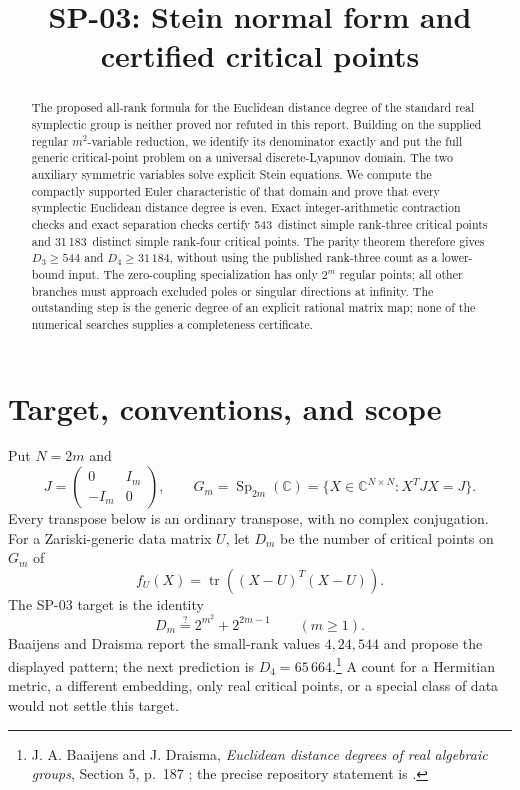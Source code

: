\documentclass[11pt]{article}
\title{SP-03: Stein normal form and certified critical points}
\author{}\date{}
\theoremstyle{remark}\newtheorem{remark}[theorem]{Remark}
\DeclareMathOperator{\tr}{tr}
\DeclareMathOperator{\Sp}{Sp}
\newcommand{\CC}{\mathbb C}
\newcommand{\rankfourroots}{31\,183}
\newcommand{\rankfourbound}{31\,184}
\newcommand{\rankthreeroots}{543}
\begin{document}
\maketitle
\begin{abstract}
The proposed all-rank formula for the Euclidean distance degree of the standard real symplectic group is neither proved nor refuted in this report. Building on the supplied regular $m^2$-variable reduction, we identify its denominator exactly and put the full generic critical-point problem on a universal discrete-Lyapunov domain. The two auxiliary symmetric variables solve explicit Stein equations. We compute the compactly supported Euler characteristic of that domain and prove that every symplectic Euclidean distance degree is even. Exact integer-arithmetic contraction checks and exact separation checks certify \rankthreeroots\ distinct simple rank-three critical points and \rankfourroots\ distinct simple rank-four critical points. The parity theorem therefore gives $D_3\ge544$ and $D_4\ge\rankfourbound$, without using the published rank-three count as a lower-bound input. The zero-coupling specialization has only $2^m$ regular points; all other branches must approach excluded poles or singular directions at infinity. The outstanding step is the generic degree of an explicit rational matrix map; none of the numerical searches supplies a completeness certificate.
\end{abstract}

\section{Target, conventions, and scope}
Put $N=2m$ and
\[
J=\begin{pmatrix}0&I_m\\-I_m&0\end{pmatrix},\qquad
G_m=\Sp_{2m}(\CC)=\{X\in\CC^{N\times N}:X^TJX=J\}.
\]
Every transpose below is an ordinary transpose, with no complex conjugation. For a Zariski-generic data matrix $U$, let $D_m$ be the number of critical points on $G_m$ of
\[
f_U(X)=\tr((X-U)^T(X-U)).
\]
The SP-03 target is the identity
\begin{equation}\label{eq:target}
D_m\stackrel{?}{=}2^{m^2}+2^{2m-1}\qquad(m\ge1).
\end{equation}
Baaijens and Draisma report the small-rank values $4,24,544$ and propose the displayed pattern; the next prediction is $D_4=65\,664$.\footnote{J. A. Baaijens and J. Draisma, \emph{Euclidean distance degrees of real algebraic groups}, Section 5, p.~187 \cite{BD}; the precise repository statement is \cite{repo}.} A count for a Hermitian metric, a different embedding, only real critical points, or a special class of data would not settle this target.
\end{document}
